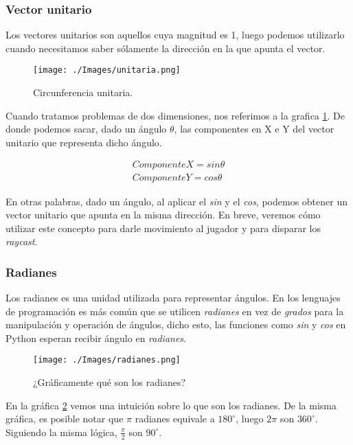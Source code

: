 \subsubsection{Vector unitario}

Los vectores unitarios son aquellos cuya magnitud es 1, luego podemos utilizarlo cuando necesitamos saber sólamente la dirección en la que apunta el vector.

\begin{figure}[h!]
	\centering
	\texttt{[image: ./Images/unitaria.png]}
	\caption{Circunferencia unitaria.}
	\label{unitaria}
\end{figure}


Cuando tratamos problemas de dos dimensiones, nos referimos a la grafica \ref{unitaria}. De donde podemos sacar, dado un ángulo $\theta$, las componentes en X e Y del vector unitario que representa dicho ángulo.

\begin{equation}
\begin{aligned}
\label{unitvector}
ComponenteX = sin \theta \\
ComponenteY = cos \theta
\end{aligned}
\end{equation}

En otras palabras, dado un ángulo, al aplicar el \emph{sin} y el \emph{cos}, podemos obtener un vector unitario que apunta en la misma dirección. En breve, veremos cómo utilizar este concepto para darle movimiento al jugador y para disparar los \emph{raycast}.

\subsubsection{Radianes}

Los radianes es una unidad utilizada para representar ángulos. En los lenguajes de programación es más común que se utilicen \emph{radianes} en vez de \emph{grados} para la manipulación y operación de ángulos, dicho esto, las funciones como \emph{sin} y \emph{cos} en Python esperan recibir ángulo en \emph{radianes}. 

\begin{figure}[h!]
	\centering
	\texttt{[image: ./Images/radianes.png]}
	\caption{¿Gráficamente qué son los radianes?}
	\label{rads}
\end{figure}

En la gráfica \ref{rads} vemos una intuición sobre lo que son los radianes. De la misma gráfica, es posible notar que $\pi$ radianes equivale a $180^{\circ}
$, luego $2\pi$ son $360^{\circ}$. Siguiendo la misma lógica, $\frac{\pi}{2}$ son  $90^{\circ}$.


